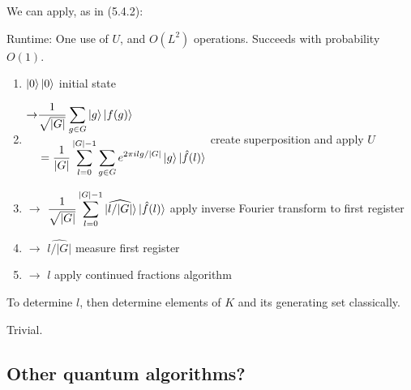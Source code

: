 \documentclass[../main.tex]{subfiles}
\begin{document}
\bigskip
\begin{exercise}
\end{exercise}
We can apply, as in (5.4.2):

\begin{mdframed}
Runtime: One use of $U$, and $O(L^2)$ operations. Succeeds with probability $O(1)$.
\begin{enumerate}[label=(\arabic*)]
    \item \quad $\ket{0}\ket{0}$ \tabto{6cm} initial state
    \item \quad $\begin{aligned}\to&\frac{1}{\sqrt{\lvert G\rvert}}\sum_{g\in G}\ket{g}\ket{f(g)}\\&=\frac{1}{\lvert G\rvert}\sum_{l=0}^{\lvert G\rvert-1}\sum_{g\in G}e^{2\pi i l g/\lvert G\rvert}\ket{g}\ket{\hat{f}(l)}\end{aligned}$ \tabto{7cm} create superposition and apply $U$
    \item \quad $\to$ $\displaystyle\frac{1}{\sqrt{\lvert G\rvert}}\sum_{l=0}^{\lvert G\rvert-1}\ket{\widehat{l/\lvert G\rvert}}\ket{\hat{f}(l)}$ \tabto{6cm} apply inverse Fourier transform to first register
    \item \quad $\to$ $\widehat{l/\lvert G\rvert}$ \tabto{6cm} measure first register
    \item \quad $\to$ $l$ \tabto{6cm} apply continued fractions algorithm
\end{enumerate}
\end{mdframed}

To determine $l$, then determine elements of $K$ and its generating set classically.

\bigskip
\begin{exercise}
\end{exercise}
Trivial.

\subsection{Other quantum algorithms?}
\end{document}
